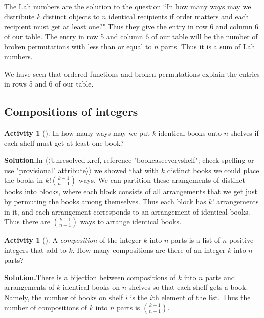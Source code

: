 \documentclass[10pt,]{book}
\theoremstyle{plain}
\theoremstyle{definition}
\newtheorem{activity}[project]{Activity}
\numberwithin{equation}{chapter}
\begin{document}
\par
The Lah numbers are the solution to the question ``In how many ways may we distribute \(k\) distinct objects to \(n\) identical recipients if order matters and each recipient must get at least one?" Thus they give the entry in row 6 and column 6 of our table. The entry in row 5 and column 6 of our table will be the number of broken permutations with less than or equal to \(n\) parts. Thus it is a sum of Lah numbers.%
\par
We have seen that ordered functions and broken permutations explain the entries in rows 5 and 6 of our table.%
\typeout{************************************************}
\typeout{************************************************}
\subsection[{Compositions of integers}]{Compositions of integers}\label{subsection-8}
\begin{activity}[]\label{activity-27}
In how many ways may we put \(k\) identical books onto \(n\) shelves if each shelf must get at least one book?%
\par\medskip\noindent%
\textbf{Solution.}\quad In {$\langle\langle$Unresolved xref, reference "bookcaseeveryshelf"; check spelling or use "provisional" attribute$\rangle\rangle$} we showed that with \(k\) distinct books we could place the books in \(k!{k-1\choose n-1}\) ways. We can partition these arangements of distinct books into blocks, where each block consists of all arrangements that we get just by permuting the books among themselves. Thus each block has \(k!\) arrangements in it, and each arrangement corresponds to an arrangement of identical books. Thus there are \(k-1\choose n-1\) ways to arrange identical books.%
\end{activity}
\begin{activity}[]\label{compositionagian}
A \emph{composition} of the integer \(k\) into \(n\) parts is a list of \(n\) positive integers that add to \(k\). How many compositions are there of an integer \(k\) into \(n\) parts?%
\par\medskip\noindent%
\textbf{Solution.}\quad There is a bijection between compositions of \(k\) into \(n\) parts and arrangements of \(k\) identical books on \(n\) shelves so that each shelf gets a book. Namely, the number of books on shelf \(i\) is the \(i\)th element of the list. Thus the number of compositions of \(k\) into \(n\) parts is \(k-1 \choose n-1\).%
\end{activity}
\end{document}
